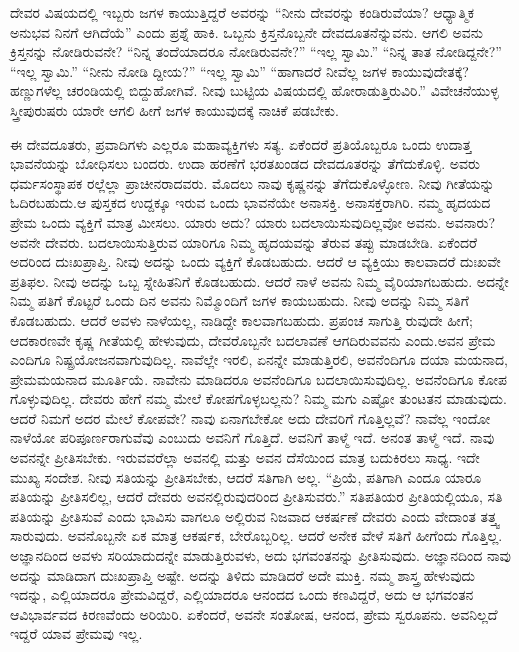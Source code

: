ದೇವರ ವಿಷಯದಲ್ಲಿ ಇಬ್ಬರು ಜಗಳ ಕಾಯುತ್ತಿದ್ದರೆ ಅವರನ್ನು “ನೀನು ದೇವರನ್ನು ಕಂಡಿರುವೆಯಾ? ಆಧ್ಯಾತ್ಮಿಕ ಅನುಭವ ನಿನಗೆ ಆಗಿದೆಯೆ” ಎಂದು ಪ್ರಶ್ನೆ ಹಾಕಿ. ಒಬ್ಬನು ಕ್ರಿಸ್ತನೊಬ್ಬನೇ ದೇವದೂತನೆನ್ನುವನು. ಆಗಲಿ ಅವನು ಕ್ರಿಸ್ತನನ್ನು ನೋಡಿರುವನೇ? “ನಿನ್ನ ತಂದೆಯಾದರೂ ನೋಡಿರುವನೇ?” “ಇಲ್ಲ ಸ್ವಾಮಿ.” “ನಿನ್ನ ತಾತ ನೋಡಿದ್ದನೇ?” “ಇಲ್ಲ ಸ್ವಾಮಿ.” “ನೀನು ನೋಡಿ ದ್ದೀಯ?” “ಇಲ್ಲ ಸ್ವಾಮಿ” “ಹಾಗಾದರೆ ನೀವೆಲ್ಲ ಜಗಳ ಕಾಯುವುದೇತಕ್ಕೆ? ಹಣ್ಣುಗಳೆಲ್ಲ ಚರಂಡಿಯಲ್ಲಿ ಬಿದ್ದುಹೋಗಿವೆ. ನೀವು ಬುಟ್ಟಿಯ ವಿಷಯದಲ್ಲಿ ಹೋರಾಡುತ್ತಿರುವಿರಿ.” ವಿವೇಚನೆಯುಳ್ಳ ಸ್ತ್ರೀಪುರುಷರು ಯಾರೇ ಆಗಲಿ ಹೀಗೆ ಜಗಳ ಕಾಯುವುದಕ್ಕೆ ನಾಚಿಕೆ ಪಡಬೇಕು.

ಈ ದೇವದೂತರು, ಪ್ರವಾದಿಗಳು ಎಲ್ಲರೂ ಮಹಾವ್ಯಕ್ತಿಗಳು ಸತ್ಯ. ಏಕೆಂದರೆ ಪ್ರತಿಯೊಬ್ಬರೂ ಒಂದು ಉದಾತ್ತ ಭಾವನೆಯನ್ನು ಬೋಧಿಸಲು ಬಂದರು. ಉದಾ ಹರಣೆಗೆ ಭರತಖಂಡದ ದೇವದೂತರನ್ನು ತೆಗೆದುಕೊಳ್ಳಿ. ಅವರು ಧರ್ಮಸಂಸ್ಥಾಪಕ ರಲ್ಲೆಲ್ಲಾ ಪ್ರಾಚೀನರಾದವರು. ಮೊದಲು ನಾವು ಕೃಷ್ಣನನ್ನು ತೆಗೆದುಕೊಳ್ಳೋಣ. ನೀವು ಗೀತೆಯನ್ನು ಓದಿರಬಹುದು.ಆ ಪುಸ್ತಕದ ಉದ್ದಕ್ಕೂ ಇರುವ ಒಂದು ಭಾವನೆಯೇ ಅನಾಸಕ್ತಿ. ಅನಾಸಕ್ತರಾಗಿರಿ. ನಮ್ಮ ಹೃದಯದ ಪ್ರೇಮ ಒಂದು ವ್ಯಕ್ತಿಗೆ ಮಾತ್ರ ಮೀಸಲು. ಯಾರು ಅದು? ಯಾರು ಬದಲಾಯಿಸುವುದಿಲ್ಲವೋ ಅವನು. ಅವನಾರು? ಅವನೇ ದೇವರು. ಬದಲಾಯಿಸುತ್ತಿರುವ ಯಾರಿಗೂ ನಿಮ್ಮ ಹೃದಯವನ್ನು ತೆರುವ ತಪ್ಪು ಮಾಡಬೇಡಿ. ಏಕೆಂದರೆ ಅದರಿಂದ ದುಃಖಪ್ರಾಪ್ತಿ. ನೀವು ಅದನ್ನು ಒಂದು ವ್ಯಕ್ತಿಗೆ ಕೊಡಬಹುದು. ಆದರೆ ಆ ವ್ಯಕ್ತಿಯು ಕಾಲವಾದರೆ ದುಃಖವೇ ಪ್ರತಿಫಲ. ನೀವು ಅದನ್ನು ಒಬ್ಬ ಸ್ನೇಹಿತನಿಗೆ ಕೊಡಬಹುದು. ಆದರೆ ನಾಳೆ ಅವನು ನಿಮ್ಮ ವೈರಿಯಾಗಬಹುದು. ಅದನ್ನೇ ನಿಮ್ಮ ಪತಿಗೆ ಕೊಟ್ಟರೆ ಒಂದು ದಿನ ಅವನು ನಿಮ್ಮೊಂದಿಗೆ ಜಗಳ ಕಾಯಬಹುದು. ನೀವು ಅದನ್ನು ನಿಮ್ಮ ಸತಿಗೆ ಕೊಡಬಹುದು. ಆದರೆ ಅವಳು ನಾಳೆಯಲ್ಲ, ನಾಡಿದ್ದೇ ಕಾಲವಾಗಬಹುದು. ಪ್ರಪಂಚ ಸಾಗುತ್ತಿ ರುವುದೇ ಹೀಗೆ; ಆದಕಾರಣವೇ ಕೃಷ್ಣ ಗೀತೆಯಲ್ಲಿ ಹೇಳುವುದು, ದೇವರೊಬ್ಬನೇ ಬದಲಾವಣೆ ಆಗದಿರುವವನು ಎಂದು.ಅವನ ಪ್ರೇಮ ಎಂದಿಗೂ ನಿಷ್ಪ್ರಯೋಜನವಾಗುವುದಿಲ್ಲ. ನಾವೆಲ್ಲೇ ಇರಲಿ, ಏನನ್ನೇ ಮಾಡುತ್ತಿರಲಿ, ಅವನೆಂದಿಗೂ ದಯಾ ಮಯನಾದ, ಪ್ರೇಮಮಯನಾದ ಮೂರ್ತಿಯೆ. ನಾವೇನು ಮಾಡಿದರೂ ಅವನೆಂದಿಗೂ ಬದಲಾಯಿಸುವುದಿಲ್ಲ. ಅವನೆಂದಿಗೂ ಕೋಪ ಗೊಳ್ಳುವುದಿಲ್ಲ. ದೇವರು ಹೇಗೆ ನಮ್ಮ ಮೇಲೆ ಕೋಪಗೊಳ್ಳಬಲ್ಲನು? ನಿಮ್ಮ ಮಗು ಎಷ್ಟೋ ತುಂಟತನ ಮಾಡುವುದು. ಆದರೆ ನಿಮಗೆ ಅದರ ಮೇಲೆ ಕೋಪವೇ? ನಾವು ಏನಾಗಬೇಕೋ ಅದು ದೇವರಿಗೆ ಗೊತ್ತಿಲ್ಲವೆ? ನಾವೆಲ್ಲ ಇಂದೋ ನಾಳೆಯೋ ಪರಿಪೂರ್ಣರಾಗುವೆವು ಎಂಬುದು ಅವನಿಗೆ ಗೊತ್ತಿದೆ. ಅವನಿಗೆ ತಾಳ್ಮೆ ಇದೆ. ಅನಂತ ತಾಳ್ಮೆ ಇದೆ. ನಾವು ಅವನನ್ನೇ ಪ್ರೀತಿಸಬೇಕು. ಇರುವವರೆಲ್ಲಾ ಅವನಲ್ಲಿ ಮತ್ತು ಅವನ ದೆಸೆಯಿಂದ ಮಾತ್ರ ಬದುಕಿರಲು ಸಾಧ್ಯ. ಇದೇ ಮುಖ್ಯ ಸಂದೇಶ. ನೀವು ಸತಿಯನ್ನು ಪ್ರೀತಿಸಬೇಕು, ಆದರೆ ಸತಿಗಾಗಿ ಅಲ್ಲ. “ಪ್ರಿಯೆ, ಪತಿಗಾಗಿ ಎಂದೂ ಯಾರೂ ಪತಿಯನ್ನು ಪ್ರೀತಿಸಲಿಲ್ಲ, ಆದರೆ ದೇವರು ಅವನಲ್ಲಿರುವುದರಿಂದ ಪ್ರೀತಿಸುವರು.” ಸತಿಪತಿಯರ ಪ್ರೀತಿಯಲ್ಲಿಯೂ, ಸತಿ ಪತಿಯನ್ನು ಪ್ರೀತಿಸುವೆ ಎಂದು ಭಾವಿಸು ವಾಗಲೂ ಅಲ್ಲಿರುವ ನಿಜವಾದ ಆಕರ್ಷಣೆ ದೇವರು ಎಂದು ವೇದಾಂತ ತತ್ತ್ವ ಸಾರುವುದು. ಅವನೊಬ್ಬನೇ ಏಕ ಮಾತ್ರ ಆಕರ್ಷಕ, ಬೇರೊಬ್ಬರಿಲ್ಲ. ಆದರೆ ಅನೇಕ ವೇಳೆ ಸತಿಗೆ ಹೀಗೆಂದು ಗೊತ್ತಿಲ್ಲ. ಅಜ್ಞಾನದಿಂದ ಅವಳು ಸರಿಯಾದುದನ್ನೇ ಮಾಡುತ್ತಿರುವಳು, ಅದು ಭಗವಂತನನ್ನು ಪ್ರೀತಿಸುವುದು. ಅಜ್ಞಾನದಿಂದ ನಾವು ಅದನ್ನು ಮಾಡಿದಾಗ ದುಃಖಪ್ರಾಪ್ತಿ ಅಷ್ಟೇ. ಅದನ್ನು ತಿಳಿದು ಮಾಡಿದರೆ ಅದೇ ಮುಕ್ತಿ. ನಮ್ಮ ಶಾಸ್ತ್ರ ಹೇಳುವುದು ಇದನ್ನು, ಎಲ್ಲಿಯಾದರೂ ಪ್ರೇಮವಿದ್ದರೆ, ಎಲ್ಲಿಯಾದರೂ ಆನಂದದ ಒಂದು ಕಣವಿದ್ದರೆ, ಅದು ಆ ಭಗವಂತನ ಆವಿಭಾರ್ವವದ ಕಿರಣವೆಂದು ಅರಿಯಿರಿ. ಏಕೆಂದರೆ, ಅವನೇ ಸಂತೋಷ, ಆನಂದ, ಪ್ರೇಮ ಸ್ವರೂಪನು. ಅವನಿಲ್ಲದೆ ಇದ್ದರೆ ಯಾವ ಪ್ರೇಮವು ಇಲ್ಲ.

